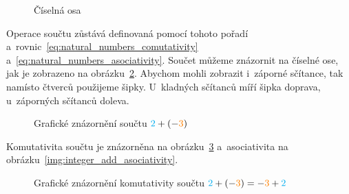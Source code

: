 \begin{figure}[!h]
\centering
{}
\caption{Číselná osa}
\label{img:integer_number_line}
\end{figure}

Operace součtu zůstává definovaná pomocí tohoto pořadí a~rovnic~\eqref{eq:natural_numbers_comutativity} a~\eqref{eq:natural_numbers_asociativity}. Součet můžeme znázornit na číselné ose, jak je zobrazeno na obrázku~\ref{img:integer_add}. Abychom mohli zobrazit i~záporné sčítance, tak namísto čtverců použijeme šipky. U~kladných sčítanců míří šipka doprava, u~záporných sčítanců doleva.

\begin{figure}[!h]
\centering
{}
\caption{Grafické znázornění součtu \(\textcolor{cyan}{2} + (-\textcolor{orange}{3})\)}
\label{img:integer_add}
\end{figure}

Komutativita součtu je znázorněna na obrázku~\ref{img:integer_add_comutativity} a~asociativita na obrázku~\ref{img:integer_add_asociativity}.

\begin{figure}[!h]
\centering
{}
\caption{Grafické znázornění komutativity součtu \(\textcolor{cyan}{2} + (-\textcolor{orange}{3}) = -\textcolor{orange}{3} + \textcolor{cyan}{2}\)}
\label{img:integer_add_comutativity}
\end{figure}

